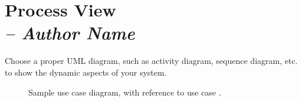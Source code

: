 \chapter{Process View \\
\small{\textit{-- Author Name}}
\label{Chapter::ProcessView}}

Choose a proper UML diagram, such as activity diagram, sequence diagram, etc. to show the
dynamic aspects of your system.

\begin{figure}[h]
\centering
\caption{ Sample use case diagram, with 
reference to use case .}
\end{figure}
